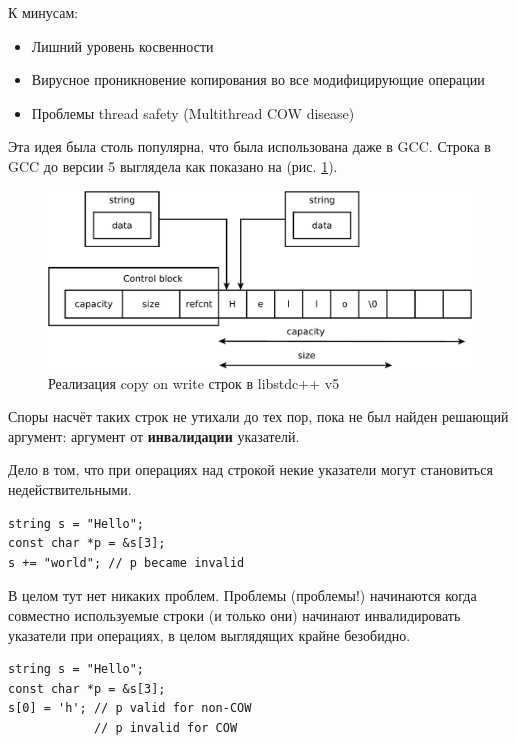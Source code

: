 \documentclass[a4paper,12pt,oneside]{book}
\begin{document}
К минусам:

\begin{itemize}
\item Лишний уровень косвенности
\item Вирусное проникновение копирования во все модифицирующие операции
\item Проблемы thread safety (Multithread COW disease)
\end{itemize}

Эта идея была столь популярна, что была использована даже в GCC. Строка в GCC до версии 5 выглядела как показано на (рис. \ref{fig:string-cow-gcc}).

\begin{figure}[ht]
\centering
\includegraphics[width=1.0\textwidth]{illustrations/string-cow-gcc-crop.pdf}
\caption{Реализация copy on write строк в libstdc++ v5}
\label{fig:string-cow-gcc}
\end{figure}

Споры насчёт таких строк не утихали до тех пор, пока не был найден решающий аргумент: аргумент от \textbf{инвалидации} указателй. 

Дело в том, что при операциях над строкой некие указатели могут становиться недействительными.

\begin{lstlisting}
string s = "Hello";
const char *p = &s[3];
s += "world"; // p became invalid
\end{lstlisting}

В целом тут нет никаких проблем. Проблемы (проблемы!) начинаются когда совместно используемые строки (и только они) начинают инвалидировать указатели при операциях, в целом выглядящих крайне безобидно.

\begin{lstlisting}
string s = "Hello";
const char *p = &s[3];
s[0] = 'h'; // p valid for non-COW
            // p invalid for COW
\end{lstlisting}
\end{document}
